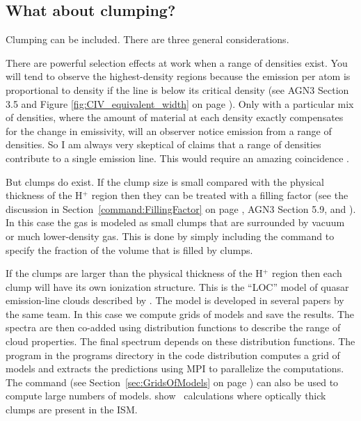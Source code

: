 \documentclass[12pt,twoside]{article}
\begin{document}
\subsection{What about clumping?}

Clumping can be included.  There are three general considerations.

There are powerful selection effects at work when a range of densities
exist.  You will tend to observe the highest-density regions because the
emission per atom is proportional to density if the line is below its
critical density (see AGN3 Section 3.5 and
Figure \ref{fig:CIV_equivalent_width}
on page \pageref{fig:CIV_equivalent_width}).
Only with a particular mix of
densities, where the amount of material at each density exactly compensates
for the change in emissivity, will an observer notice emission from a range
of densities.  So I am always very skeptical of claims that a range of
densities contribute to a single emission line.
This would require an amazing coincidence 
\citep{Ferland.G11Molecular-hydrogen-in-NLSys-and-its-implications}.

But clumps do exist.
If the clump size is small compared with the
physical thickness of the H$^+$ region then they can be treated with a filling
factor (see the discussion in
Section~\ref{command:FillingFactor} on page
\pageref{command:FillingFactor},
 AGN3 Section 5.9, and \citet{Osterbrock1959}).
In this
case the gas is modeled as small clumps that are surrounded by vacuum or
much lower-density gas.
This is done by simply including the
 command to specify the fraction
of the volume that is filled by clumps.

If the clumps are larger than the physical thickness of the H$^+$ region
then each clump will have its own ionization structure.
This is the ``LOC''
model of quasar emission-line clouds described by
\citet{BaldwinEtAl95}.
The model is developed in several papers by the same team.
In this case
we compute grids of models and save the results.  The spectra are then
co-added using distribution functions to describe the range of cloud
properties.  The final spectrum depends on these distribution functions.
The program  in the programs directory in the code distribution
computes a grid of models and extracts the predictions using MPI to parallelize
the computations.
The  command (see
Section~\ref{sec:GridsOfModels} on page
\pageref{sec:GridsOfModels}) can also
be used to compute large numbers of models.
\citet{GiammancoEtAl_clumpsCloudy04} show \Cloudy\ calculations
where optically thick clumps are present in the ISM.
\end{document}
